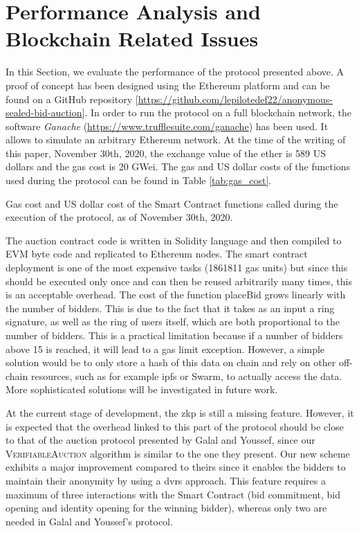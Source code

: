 \section{Performance Analysis and Blockchain Related Issues}
\label{sec-performance}

In this Section, we evaluate the performance of the protocol presented above. A proof of concept has been designed using the Ethereum platform and can be found on a GitHub repository [\url{https://github.com/lepilotedef22/anonymous-sealed-bid-auction}]. In order to run the protocol on a full blockchain network, the software \textit{Ganache} (\url{https://www.trufflesuite.com/ganache}) has been used. It allows to simulate an arbitrary Ethereum network. At the time of the writing of this paper, November 30th, 2020, the exchange value of the ether is 589 US dollars and the gas cost is 20 GWei. The gas and US dollar costs of the functions used during the protocol can be found in Table \ref{tab:gas_cost}.
\begin{table}[h]
    \centering
    \caption{Gas cost and US dollar cost of the Smart Contract functions called during the execution of the protocol, as of November 30th, 2020.}
    \label{tab:gas_cost}
\end{table}
The auction contract code is written in Solidity language and then compiled to EVM byte code and replicated to Ethereum nodes. The smart contract deployment is one of the most expensive tasks (1861811 gas units) but since this should be executed only once and can then be reused arbitrarily many times, this is an acceptable overhead. The cost of the function placeBid grows linearly with the number of bidders. This is due to the fact that it takes as an input a ring signature, as well as the ring of users itself, which are both proportional to the number of bidders. This is a practical limitation because if a number of bidders above 15 is reached, it will lead to a gas limit exception. However, a simple solution would be to only store a hash of this data on chain and rely on other off-chain resources, such as for example \gls{ipfs} or Swarm, to actually access the data. More sophisticated solutions will be investigated in future work.

At the current stage of development, the \gls{zkp} is still a missing feature. However, it is expected that the overhead linked to this part of the protocol should be close to that of the auction protocol presented by Galal and Youssef\cite{galal2018succinctly}, since our \textsc{VerifiableAuction} algorithm is similar to the one they present. Our new scheme exhibits a major improvement compared to theirs since it enables the bidders to maintain their anonymity by using a \gls{dvrs} approach. This feature requires a maximum of three interactions with the Smart Contract (bid commitment, bid opening and identity opening for the winning bidder), whereas only two are needed in Galal and Youssef's protocol. 

